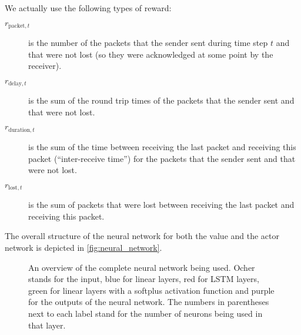 \documentclass[sigconf]{acmart}
\begin{document}
We actually use the following types of reward: 
\begin{description}
\item[$\textit{r}_{\text{packet},t}$] is the number of the packets that the sender sent during time step $t$ and that were not lost (so they were acknowledged at some point by the receiver).
\item[$\textit{r}_{\text{delay},t}$] is the sum of the round trip times of the packets that the sender sent and that were not lost.
\item[$\textit{r}_{\text{duration},t}$] is the sum of the time between receiving the last packet and receiving this packet (``inter-receive time'') for the packets that the sender sent and that were not lost.
\item[$\textit{r}_{\text{lost},t}$] is the sum of packets that were lost between receiving the last packet and receiving this packet.
\end{description}


The overall structure of the neural network for both the value and the actor network is depicted in \autoref{fig:neural_network}.

\begin{figure}



\caption{An overview of the complete neural network being used. Ocher stands for the input, blue for linear layers, red for LSTM layers, green for linear layers with a softplus activation function and purple for the outputs of the neural network. The numbers in parentheses next to each label stand  for the number of neurons being used in that layer.}
\label{fig:neural_network}
\end{figure}
\end{document}
